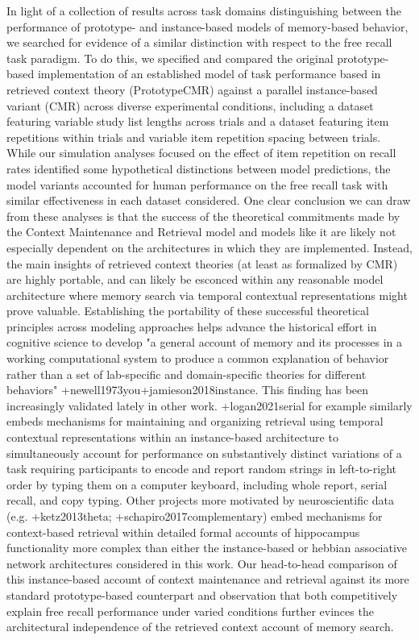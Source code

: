 In light of a collection of results across task domains distinguishing between the performance of prototype- and instance-based models of memory-based behavior, we searched for evidence of a similar distinction with respect to the free recall task paradigm. To do this, we specified and compared the original prototype-based implementation of an established model of task performance based in retrieved context theory (PrototypeCMR) against a parallel instance-based variant (CMR) across diverse experimental conditions, including a dataset featuring variable study list lengths across trials and a dataset featuring item repetitions within trials and variable item repetition spacing between trials. While our simulation analyses focused on the effect of item repetition on recall rates identified some hypothetical distinctions between model predictions, the model variants accounted for human performance on the free recall task with similar effectiveness in each dataset considered.\markdownRendererInterblockSeparator
{}One clear conclusion we can draw from these analyses is that the success of the theoretical commitments made by the Context Maintenance and Retrieval model and models like it are likely not especially dependent on the architectures in which they are implemented. Instead, the main insights of retrieved context theories (at least as formalized by CMR) are highly portable, and can likely be esconced within any reasonable model architecture where memory search via temporal contextual representations might prove valuable. Establishing the portability of these successful theoretical principles across modeling approaches helps advance the historical effort in cognitive science to develop "a general account of memory and its processes in a working computational system to produce a common explanation of behavior rather than a set of lab-specific and domain-specific theories for different behaviors" +{}{}{newell1973you}+{}{}{jamieson2018instance}.\markdownRendererInterblockSeparator
{}This finding has been increasingly validated lately in other work. +{}{}{logan2021serial} for example similarly embeds mechanisms for maintaining and organizing retrieval using temporal contextual representations within an instance-based architecture to simultaneously account for performance on substantively distinct variations of a task requiring participants to encode and report random strings in left-to-right order by typing them on a computer keyboard, including whole report, serial recall, and copy typing. Other projects more motivated by neuroscientific data (e.g. +{}{}{ketz2013theta}; +{}{}{schapiro2017complementary}) embed mechanisms for context-based retrieval within detailed formal accounts of hippocampus functionality more complex than either the instance-based or hebbian associative network architectures considered in this work. Our head-to-head comparison of this instance-based account of context maintenance and retrieval against its more standard prototype-based counterpart and observation that both competitively explain free recall performance under varied conditions further evinces the architectural independence of the retrieved context account of memory search.\markdownRendererInterblockSeparator
